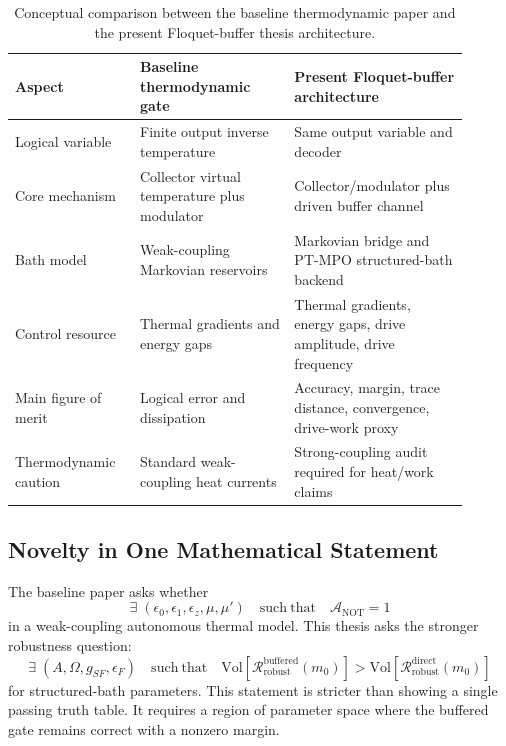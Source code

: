 \documentclass[11pt]{article}
\begin{document}
\begin{table}[H]
\centering
\caption{Conceptual comparison between the baseline thermodynamic paper and the present
Floquet-buffer thesis architecture.}
\begin{tabular}{p{0.24\linewidth}p{0.31\linewidth}p{0.35\linewidth}}
\toprule
Aspect & Baseline thermodynamic gate & Present Floquet-buffer architecture \\
\midrule
Logical variable & Finite output inverse temperature & Same output variable and decoder \\
Core mechanism & Collector virtual temperature plus modulator & Collector/modulator plus driven buffer channel \\
Bath model & Weak-coupling Markovian reservoirs & Markovian bridge and PT-MPO structured-bath backend \\
Control resource & Thermal gradients and energy gaps & Thermal gradients, energy gaps, drive amplitude, drive frequency \\
Main figure of merit & Logical error and dissipation & Accuracy, margin, trace distance, convergence, drive-work proxy \\
Thermodynamic caution & Standard weak-coupling heat currents & Strong-coupling audit required for heat/work claims \\
\bottomrule
\end{tabular}
\end{table}

\subsection{Novelty in One Mathematical Statement}

The baseline paper asks whether
\begin{equation}
    \exists\;(\epsilon_0,\epsilon_1,\epsilon_z,\mu,\mu')
    \quad\mathrm{such\ that}\quad
    \mathcal{A}_{\mathrm{NOT}}=1
\end{equation}
in a weak-coupling autonomous thermal model.  This thesis asks the stronger robustness
question:
\begin{equation}
    \exists\;(A,\Omega,g_{SF},\epsilon_F)
    \quad\mathrm{such\ that}\quad
    \mathrm{Vol}\!\left[
        \mathcal{R}_{\mathrm{robust}}^{\mathrm{buffered}}(m_0)
    \right]
    >
    \mathrm{Vol}\!\left[
        \mathcal{R}_{\mathrm{robust}}^{\mathrm{direct}}(m_0)
    \right]
\end{equation}
for structured-bath parameters.  This statement is stricter than showing a single passing
truth table.  It requires a region of parameter space where the buffered gate remains
correct with a nonzero margin.
\end{document}
